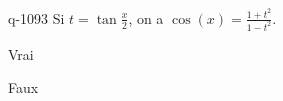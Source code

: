\begin{truefalse}{q-1093}
Si $t=\tan\frac{x}{2}$, on a $\cos(x)=\frac{1+t^2}{1-t^2}$.
\item Vrai
\item* Faux
\end{truefalse}

